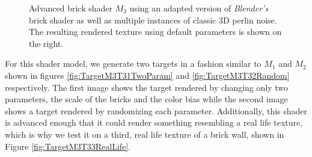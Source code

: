 \begin{figure}
    \centering
    \caption{Advanced brick shader $M_3$ using an adapted version of \textit{Blender's} brick shader as well as multiple instances of classic 3D perlin noise. The resulting rendered texture using default parameters is shown on the right.}
    \label{fig:M3NodeGraphAndDefaultRender}
\end{figure}

For this shader model, we generate two targets in a fashion similar to $M_1$ and $M_2$ shown in figures \ref{fig:TargetM3T31TwoParam} and \ref{fig:TargetM3T32Random} respectively. The first image shows the target rendered by changing only two parameters, the scale of the bricks and the color bias while the second image shows a target rendered by randomizing each parameter. Additionally, this shader is advanced enough that it could render something resembling a real life texture, which is why we test it on a third, real life texture of a brick wall, shown in Figure \ref{fig:TargetM3T33RealLife}.

